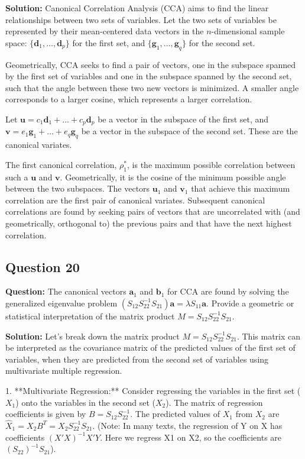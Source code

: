 \textbf{Solution:}
Canonical Correlation Analysis (CCA) aims to find the linear relationships between two sets of variables. Let the two sets of variables be represented by their mean-centered data vectors in the $n$-dimensional sample space: $\{\mathbf{d}_1, \dots, \mathbf{d}_p\}$ for the first set, and $\{\mathbf{g}_1, \dots, \mathbf{g}_q\}$ for the second set.

Geometrically, CCA seeks to find a pair of vectors, one in the subspace spanned by the first set of variables and one in the subspace spanned by the second set, such that the angle between these two new vectors is minimized. A smaller angle corresponds to a larger cosine, which represents a larger correlation.

Let $\mathbf{u} = c_1\mathbf{d}_1 + \dots + c_p\mathbf{d}_p$ be a vector in the subspace of the first set, and $\mathbf{v} = e_1\mathbf{g}_1 + \dots + e_q\mathbf{g}_q$ be a vector in the subspace of the second set. These are the canonical variates.

The first canonical correlation, $\rho_1^*$, is the maximum possible correlation between such a $\mathbf{u}$ and $\mathbf{v}$. Geometrically, it is the cosine of the minimum possible angle between the two subspaces. The vectors $\mathbf{u}_1$ and $\mathbf{v}_1$ that achieve this maximum correlation are the first pair of canonical variates. Subsequent canonical correlations are found by seeking pairs of vectors that are uncorrelated with (and geometrically, orthogonal to) the previous pairs and that have the next highest correlation.

\subsection*{Question 20}
\textbf{Question:} The canonical vectors $\mathbf{a}_1$ and $\mathbf{b}_1$ for CCA are found by solving the generalized eigenvalue problem $(S_{12}S_{22}^{-1}S_{21})\mathbf{a} = \lambda S_{11}\mathbf{a}$. Provide a geometric or statistical interpretation of the matrix product $M = S_{12}S_{22}^{-1}S_{21}$.

\textbf{Solution:}
Let's break down the matrix product $M = S_{12}S_{22}^{-1}S_{21}$. This matrix can be interpreted as the covariance matrix of the predicted values of the first set of variables, when they are predicted from the second set of variables using multivariate multiple regression.

1.  **Multivariate Regression:** Consider regressing the variables in the first set ($X_1$) onto the variables in the second set ($X_2$). The matrix of regression coefficients is given by $B = S_{12}S_{22}^{-1}$. The predicted values of $X_1$ from $X_2$ are $\hat{X}_1 = X_2 B^T = X_2 S_{22}^{-1}S_{21}$. (Note: In many texts, the regression of Y on X has coefficients $(X'X)^{-1}X'Y$. Here we regress X1 on X2, so the coefficients are $(S_{22})^{-1}S_{21}$).

